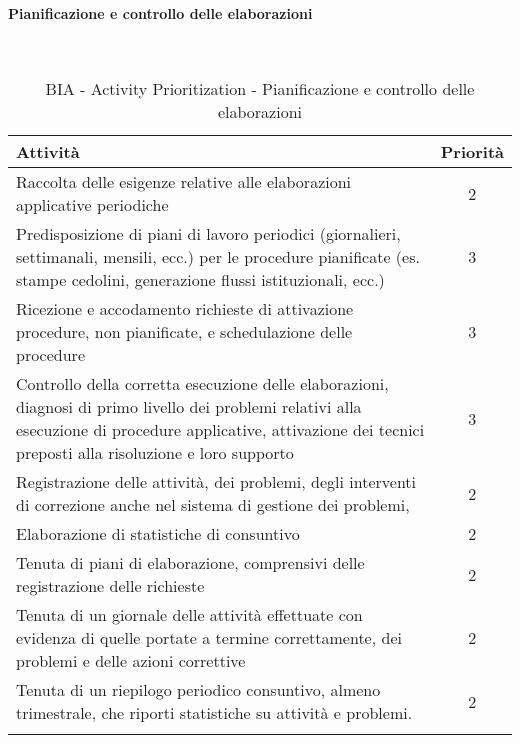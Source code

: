 \newpage
\paragraph{Pianificazione e controllo delle elaborazioni}
\textcolor{white}{.} \\
\renewcommand\arraystretch{1,5}
\begin{longtable}{p{11cm} c }
\toprule
\textbf{Attività} & \textbf{Priorità} \\
\toprule
Raccolta delle esigenze relative alle elaborazioni applicative periodiche  & 2 \\
Predisposizione  di  piani  di  lavoro  periodici  (giornalieri,  settimanali,  mensili,  ecc.)  per  le procedure pianificate (es. stampe cedolini, generazione flussi istituzionali, ecc.)  & 3\\
Ricezione e accodamento  richieste  di  attivazione  procedure,  non  pianificate,  e  schedulazione  delle procedure  & 3 \\
Controllo  della  corretta  esecuzione  delle  elaborazioni,  diagnosi  di  primo  livello  dei 
problemi  relativi  alla  esecuzione  di procedure  applicative,  attivazione  dei  tecnici  preposti alla risoluzione e loro supporto  & 3 \\
Registrazione delle attività, dei problemi, degli interventi di correzione anche nel sistema di gestione dei problemi,  & 2 \\
Elaborazione di statistiche di consuntivo  & 2\\
Tenuta di piani di elaborazione, comprensivi delle registrazione delle richieste  & 2\\
Tenuta di  un giornale delle attività effettuate con evidenza di quelle portate a termine correttamente, dei problemi e delle azioni correttive & 2 \\
Tenuta di  un  riepilogo  periodico  consuntivo,  almeno  trimestrale,  che  riporti  statistiche  su  attività  e problemi.  & 2 \\
\bottomrule
\caption{BIA - Activity Prioritization - Pianificazione e controllo delle elaborazioni}
\end{longtable}

\newpage
